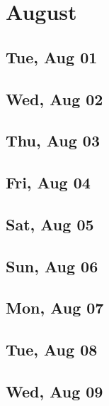 \chapter{August}
	\section{Tue, Aug 01}
		
		
	\section{Wed, Aug 02}
		
		
	\section{Thu, Aug 03}
		
		
	\section{Fri, Aug 04}
		
		
	\section{Sat, Aug 05}
		
		
	\section{Sun, Aug 06}
		
		
	\section{Mon, Aug 07}
		
		
	\section{Tue, Aug 08}
		
		
	\section{Wed, Aug 09}
		
		

